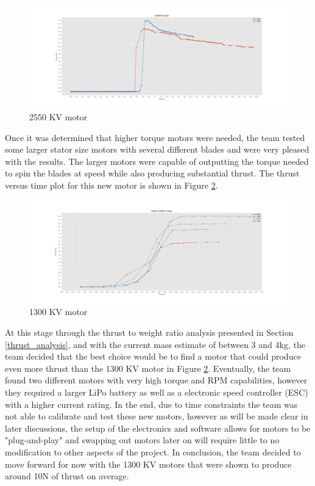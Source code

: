 \begin{figure}[H]
    \centering
    \includegraphics[width=\textwidth]{src/figs/small_2550_motor.png}
    \caption{2550 KV motor}
    \label{design:sts:2550}
\end{figure}
Once it was determined that higher torque motors were needed, the team tested some larger stator size motors with several different blades and were very pleased with the results. The larger motors were capable of outputting the torque needed to spin the blades at speed while also producing substantial thrust. The thrust versus time plot for this new motor is shown in Figure \ref{design:sts:purple}.
\begin{figure}[H]
    \centering
    \includegraphics[width=\textwidth]{src/figs/purple_motor.png}
    \caption{1300 KV motor}
    \label{design:sts:purple}
\end{figure}
At this stage through the thrust to weight ratio analysis presented in Section \ref{thrust_analysis}, and with the current mass estimate of between 3 and 4kg, the team decided that the best choice would be to find a motor that could produce even more thrust than the  1300 KV motor in Figure \ref{design:sts:purple}. Eventually, the team found two different motors with very high torque and RPM capabilities, however they required a larger LiPo battery as well as a electronic speed controller (ESC) with a higher current rating. In the end, due to time constraints the team was not able to calibrate and test these new motors, however as will be made clear in later discussions, the setup of the electronics and software allows for motors to be "plug-and-play" and swapping out motors later on will require little to no modification to other aspects of the project. In conclusion, the team decided to move forward for now with the 1300 KV motors that were shown to produce around 10N of thrust on average.

